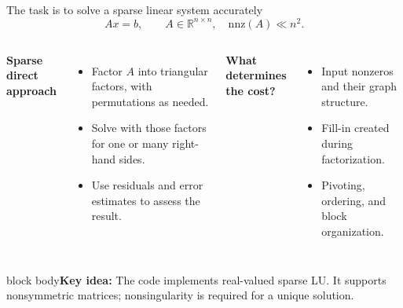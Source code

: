 \documentclass[aspectratio=169,10pt]{beamer}
\newcommand{\takeaway}[1]{\vfill\begin{beamercolorbox}[sep=7pt,wd=\textwidth]{block body}\small\textbf{Key idea:} #1\end{beamercolorbox}}
\begin{document}
\begin{frame}{The task is to solve a sparse linear system accurately}
\[
\boxed{\quad Ax=b,\qquad A\in\mathbb{R}^{n\times n},\quad\mathrm{nnz}(A)\ll n^2.\quad}
\]
\begin{columns}[T,onlytextwidth]
\textbf{Sparse direct approach}
\begin{itemize}\setlength\itemsep{5pt}
\item Factor $A$ into triangular factors, with permutations as needed.
\item Solve with those factors for one or many right-hand sides.
\item Use residuals and error estimates to assess the result.
\end{itemize}
\textbf{What determines the cost?}
\begin{itemize}\setlength\itemsep{5pt}
\item Input nonzeros and their graph structure.
\item Fill-in created during factorization.
\item Pivoting, ordering, and block organization.
\end{itemize}
\end{columns}
\vspace{.15cm}
\takeaway{The code implements real-valued sparse LU. It supports nonsymmetric matrices; nonsingularity is required for a unique solution.}
\end{frame}
\end{document}
